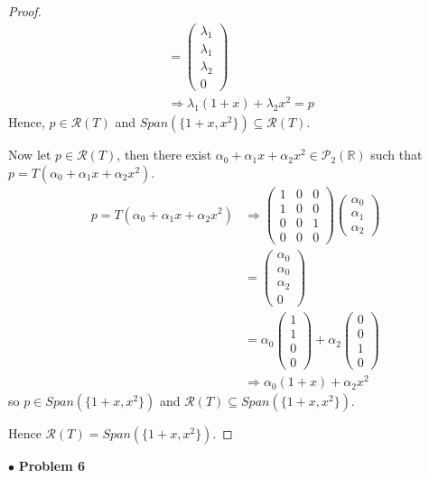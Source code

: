 \documentclass{article}
\begin{document}
\begin{proof}
\begin{align*}
&= \begin{pmatrix} \lambda_1 \\ \lambda_1 \\ \lambda_2 \\ 0 \end{pmatrix}\\
&\Rightarrow \lambda_1(1+x)+\lambda_2x^2 = p
\end{align*}
Hence, $p \in \mathcal{R}(T)$ and $Span(\{1+x, x^2 \}) \subseteq \mathcal{R}(T)$.

Now let $p \in \mathcal{R}(T)$, then there exist $\alpha_0+\alpha_1 x+\alpha_2 x^2 \in \mathcal{P}_2(\mathbb{R})$ such that $p = T(\alpha_0+\alpha_1 x+\alpha_2 x^2)$.
\begin{align*}
p = T(\alpha_0+\alpha_1 x+\alpha_2 x^2) & \Rightarrow \begin{pmatrix} 1&0&0 \\ 1&0&0 \\ 0&0&1 \\ 0&0&0 \end{pmatrix} \begin{pmatrix} \alpha_0 \\ \alpha_1 \\ \alpha_2 \end{pmatrix} \\
&= \begin{pmatrix} \alpha_0 \\ \alpha_0 \\\alpha_2 \\0 \end{pmatrix} \\
&= \alpha_0 \begin{pmatrix} 1 \\1 \\0\\0 \end{pmatrix} + \alpha_2 \begin{pmatrix} 0 \\0\\ 1\\ 0 \end{pmatrix} \\
& \Rightarrow \alpha_0(1+x)+\alpha_2x^2
\end{align*} 
so $p \in Span(\{ 1+x, x^2 \})$ and $ \mathcal{R}(T) \subseteq Span(\{1+x, x^2 \} )$.

Hence $ \mathcal{R}(T) = Span(\{1+x, x^2 \} )$.
\end{proof}

\newpage
$ \bullet$ \textbf{Problem 6}
\medskip
\end{document}
